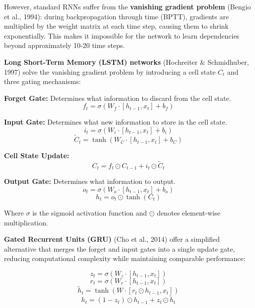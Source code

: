 \documentclass[12pt, a4paper]{report}
\begin{document}
However, standard RNNs suffer from the \textbf{vanishing gradient problem} (Bengio et al., 1994): during backpropagation through time (BPTT), gradients are multiplied by the weight matrix at each time step, causing them to shrink exponentially. This makes it impossible for the network to learn dependencies beyond approximately 10-20 time steps.

\textbf{Long Short-Term Memory (LSTM) networks} (Hochreiter \& Schmidhuber, 1997) solve the vanishing gradient problem by introducing a cell state $C_t$ and three gating mechanisms:

\textbf{Forget Gate:} Determines what information to discard from the cell state.
\begin{equation}
f_t = \sigma(W_f \cdot [h_{t-1}, x_t] + b_f)
\end{equation}

\textbf{Input Gate:} Determines what new information to store in the cell state.
\begin{equation}
i_t = \sigma(W_i \cdot [h_{t-1}, x_t] + b_i)
\end{equation}
\begin{equation}
\tilde{C}_t = \tanh(W_C \cdot [h_{t-1}, x_t] + b_C)
\end{equation}

\textbf{Cell State Update:}
\begin{equation}
C_t = f_t \odot C_{t-1} + i_t \odot \tilde{C}_t
\end{equation}

\textbf{Output Gate:} Determines what information to output.
\begin{equation}
o_t = \sigma(W_o \cdot [h_{t-1}, x_t] + b_o)
\end{equation}
\begin{equation}
h_t = o_t \odot \tanh(C_t)
\end{equation}

Where $\sigma$ is the sigmoid activation function and $\odot$ denotes element-wise multiplication.

\textbf{Gated Recurrent Units (GRU)} (Cho et al., 2014) offer a simplified alternative that merges the forget and input gates into a single update gate, reducing computational complexity while maintaining comparable performance:

\begin{equation}
z_t = \sigma(W_z \cdot [h_{t-1}, x_t])
\end{equation}
\begin{equation}
r_t = \sigma(W_r \cdot [h_{t-1}, x_t])
\end{equation}
\begin{equation}
\tilde{h}_t = \tanh(W \cdot [r_t \odot h_{t-1}, x_t])
\end{equation}
\begin{equation}
h_t = (1 - z_t) \odot h_{t-1} + z_t \odot \tilde{h}_t
\end{equation}
\end{document}
